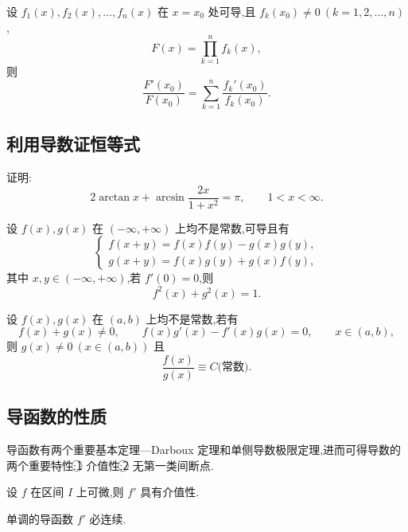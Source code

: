 \documentclass[../数学分析培优讲义.tex]{subfiles}
\begin{document}
\begin{example}
设 $f_1(x),f_2(x),\ldots,f_n(x)$ 在 $x=x_0$ 处可导,且 $f_k(x_0)\neq0\ (k=1,2,\ldots,n)$,
\[
    F(x)=\prod\limits_{k=1}^n f_k(x),
\]
则
\[
    \dfrac{F'(x_0)}{F(x_0)}
    =\sum\limits_{k=1}^n\dfrac{f_k'(x_0)}{f_k(x_0)}.
\]
\end{example}
\exampleblank


\newpage

\subsection{利用导数证恒等式}

\begin{example}
证明:
\[
    2\arctan x+\arcsin\dfrac{2x}{1+x^2}=\pi,
    \qquad 1<x<\infty.
\]
\end{example}
\exampleblank

\begin{example}
设 $f(x),g(x)$ 在 $(-\infty,+\infty)$ 上均不是常数,可导且有
\[
\begin{cases}
    f(x+y)=f(x)f(y)-g(x)g(y),\\
    g(x+y)=f(x)g(y)+g(x)f(y),
\end{cases}
\]
其中 $x,y\in(-\infty,+\infty)$,若 $f'(0)=0$,则
\[
    f^2(x)+g^2(x)=1.
\]
\end{example}
\exampleblank

\begin{example}
设 $f(x),g(x)$ 在 $(a,b)$ 上均不是常数,若有
\[
    f(x)+g(x)\neq0,
    \qquad
    f(x)g'(x)-f'(x)g(x)=0,
    \qquad x\in(a,b),
\]
则 $g(x)\neq0\ (x\in(a,b))$ 且
\[
    \dfrac{f(x)}{g(x)}\equiv C\text{(常数)}.
\]
\end{example}
\exampleblank


\newpage

\subsection{导函数的性质}

导函数有两个重要基本定理---Darboux 定理和单侧导数极限定理,进而可得导数的两个重要特性:\textcircled{1} 介值性;\textcircled{2} 无第一类间断点.

\begin{theorem}
设 $f$ 在区间 $I$ 上可微,则 $f'$ 具有介值性.
\end{theorem}

\begin{corollary}[\markstar]
单调的导函数 $f'$ 必连续.
\end{corollary}
\end{document}
